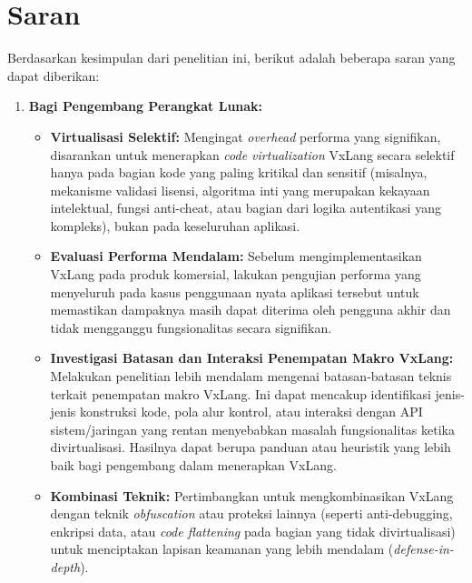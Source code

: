 \section{Saran}
Berdasarkan kesimpulan dari penelitian ini, berikut adalah beberapa saran yang dapat diberikan:

\begin{enumerate}
    \item \textbf{Bagi Pengembang Perangkat Lunak:}
        \begin{itemize}
            \item \textbf{Virtualisasi Selektif:} Mengingat \textit{overhead} performa yang signifikan, disarankan untuk menerapkan \textit{code virtualization} VxLang secara selektif hanya pada bagian kode yang paling kritikal dan sensitif (misalnya, mekanisme validasi lisensi, algoritma inti yang merupakan kekayaan intelektual, fungsi anti-cheat, atau bagian dari logika autentikasi yang kompleks), bukan pada keseluruhan aplikasi.
            \item \textbf{Evaluasi Performa Mendalam:} Sebelum mengimplementasikan VxLang pada produk komersial, lakukan pengujian performa yang menyeluruh pada kasus penggunaan nyata aplikasi tersebut untuk memastikan dampaknya masih dapat diterima oleh pengguna akhir dan tidak mengganggu fungsionalitas secara signifikan.
            \item \textbf{Investigasi Batasan dan Interaksi Penempatan Makro VxLang:} Melakukan penelitian lebih mendalam mengenai batasan-batasan teknis terkait penempatan makro VxLang. Ini dapat mencakup identifikasi jenis-jenis konstruksi kode, pola alur kontrol, atau interaksi dengan API sistem/jaringan yang rentan menyebabkan masalah fungsionalitas ketika divirtualisasi. Hasilnya dapat berupa panduan atau heuristik yang lebih baik bagi pengembang dalam menerapkan VxLang.
            \item \textbf{Kombinasi Teknik:} Pertimbangkan untuk mengkombinasikan VxLang dengan teknik \textit{obfuscation} atau proteksi lainnya (seperti anti-debugging, enkripsi data, atau \textit{code flattening} pada bagian yang tidak divirtualisasi) untuk menciptakan lapisan keamanan yang lebih mendalam (\textit{defense-in-depth}).
        \end{itemize}


\end{enumerate}
